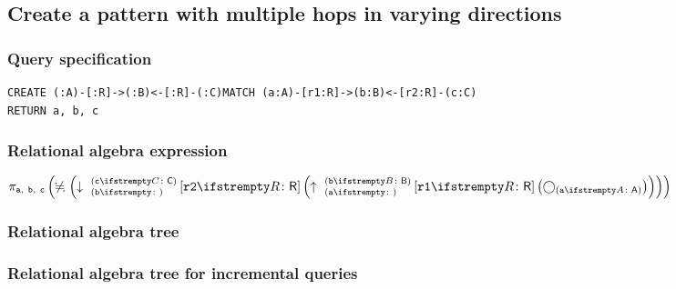 \subsection{Create a pattern with multiple hops in varying directions}

\subsubsection*{Query specification}

\begin{lstlisting}
CREATE (:A)-[:R]->(:B)<-[:R]-(:C)MATCH (a:A)-[r1:R]->(b:B)<-[r2:R]-(c:C)
RETURN a, b, c
\end{lstlisting}

\subsubsection*{Relational algebra expression}

$\projection{\var{a},~\var{b},~\var{c}} \left(\alldifferent{} \left(\expandin{b}{c}{C}{r2}{R} \left(\expandout{a}{b}{B}{r1}{R} \left(\getvertices{a}{A}\right)\right)\right)\right)$

\subsubsection*{Relational algebra tree}


\subsubsection*{Relational algebra tree for incremental queries}


